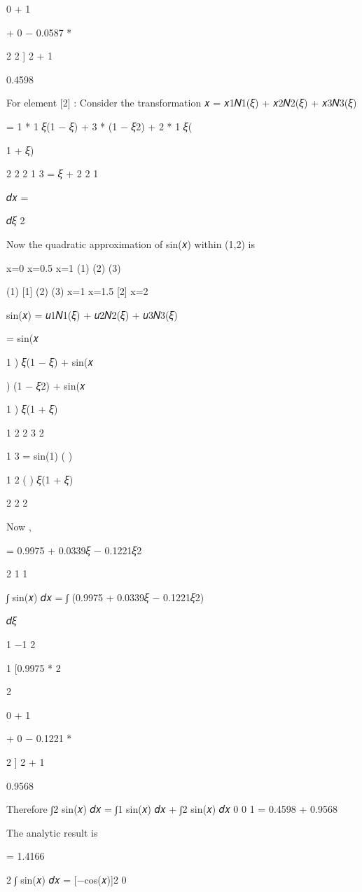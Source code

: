 {{{{{{ 
0 + 1
 


+ 0 − 0.0587 *
 
2
2
]
2 + 1
 
0.4598


For element [2] : Consider the transformation
𝑥 = 𝑥1𝑁1(𝜉) + 𝑥2𝑁2(𝜉) + 𝑥3𝑁3(𝜉)

 
= 1 * 1 𝜉(1 − 𝜉) + 3 * (1 − 𝜉2) + 2 * 1 𝜉(
 
1 + 𝜉)
 
2	2	2
1	3
=   𝜉 +  
2	2
1
 
𝑑𝑥 =
 
  𝑑𝜉 2
 
Now the quadratic approximation of sin(𝑥) within (1,2) is



x=0
	x=0.5
x=1 (1)
(2)
	(3)

(1)	[1]	(2)	(3)  x=1	x=1.5	[2]	x=2


sin(𝑥) = 𝑢1𝑁1(𝜉) + 𝑢2𝑁2(𝜉) + 𝑢3𝑁3(𝜉)

 
= sin(𝑥
 
1
)   𝜉(1 − 𝜉) + sin(𝑥
 
) (1 − 𝜉2) + sin(𝑥
 
1
)   𝜉(1 + 𝜉)
 
1  2	2	3  2

 
1	3
= sin(1)    (	)	 
 
1
2	( )   𝜉(1 + 𝜉)
 
2	2	2


 


Now ,
 
= 0.9975 + 0.0339𝜉 − 0.1221𝜉2

2	1	1
 
∫ sin(𝑥) 𝑑𝑥 = ∫ (0.9975 + 0.0339𝜉 − 0.1221𝜉2)
 
  𝑑𝜉
 
1	−1	2


 
1
  [0.9975 *
2
 
2

 
0 + 1
 
+ 0 − 0.1221 *
 
2
]
2 + 1
 
0.9568


Therefore
∫2 sin(𝑥) 𝑑𝑥 = ∫1 sin(𝑥) 𝑑𝑥 + ∫2 sin(𝑥) 𝑑𝑥
0	0	1
= 0.4598 + 0.9568

 


The analytic result is
 
= 1.4166
 

2
∫ sin(𝑥) 𝑑𝑥 = [−cos(𝑥)]2
0
 
}}}}}}
